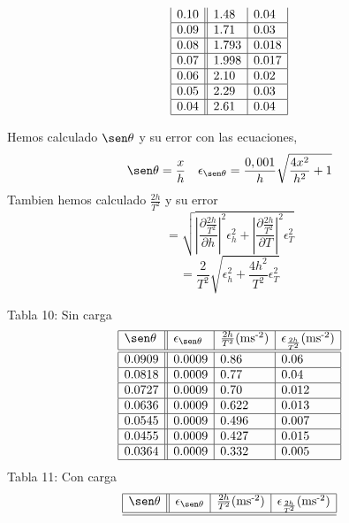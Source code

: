 \documentclass{article}
\begin{document}
\begin{multicols}{2}
\begin{center}
$$\begin{array}{cc}
\begin{array}{|l||l|l|}
        0.10 & 1.48  & 0.04   \\ \hline
        0.09 & 1.71  & 0.03   \\ \hline
        0.08 & 1.793 & 0.018  \\ \hline
        0.07 & 1.998 & 0.017  \\ \hline
        0.06 & 2.10  & 0.02   \\ \hline
        0.05 & 2.29  & 0.03   \\ \hline
        0.04 & 2.61  & 0.04   \\ \hline
        \end{array}
    \end{array}
    $$
\end{center}
Hemos calculado $\sen\theta$ y su error con las ecuaciones,
$$
\sen\theta = \frac{x}{h} \quad
\epsilon_{\sen\theta}
=
\frac{0,001}{h}
\sqrt{
    \frac{4x^2}{h^2} +1
}
$$
Tambien hemos calculado $\frac{2h}{T^2}$ y su error
$$
 = \sqrt{
    \left|
        \frac{\partial \frac{2h}{T^2}}{\partial h}
    \right|^2 \epsilon_h^2
    +
    \left|
        \frac{\partial \frac{2h}{T^2}}{\partial T}
    \right|^2 \epsilon_T^2
}
$$
$$
 = \frac{2}{T^2}\sqrt{
      \epsilon_h^2
    +
        \frac{4h^2}{T^2}
     \epsilon_T^2
}
$$
\begin{center}
    Tabla 10: Sin carga
    $$
    \begin{array}{|l||l|l|l|} \hline
        \sen\theta & \epsilon_{\sen\theta} & \frac{2h}{T^2} \text{(ms\textsuperscript{-2})} & \epsilon_{\frac{2h}{T^2}} \text{(ms\textsuperscript{-2})} \\ \hline \hline
        0.0909 & 0.0009 & 0.86  & 0.06   \\ \hline
        0.0818 & 0.0009 & 0.77  & 0.04   \\ \hline
        0.0727 & 0.0009 & 0.70  & 0.012  \\ \hline
        0.0636 & 0.0009 & 0.622 & 0.013  \\ \hline
        0.0545 & 0.0009 & 0.496 & 0.007  \\ \hline
        0.0455 & 0.0009 & 0.427 & 0.015  \\ \hline
        0.0364 & 0.0009 & 0.332 & 0.005  \\ \hline
        \end{array}
    $$
    Tabla 11: Con carga
    $$
    \begin{array}{|l||l|l|l|} \hline
        \sen\theta & \epsilon_{\sen\theta} & \frac{2h}{T^2} \text{(ms\textsuperscript{-2})} & \epsilon_{\frac{2h}{T^2}} \text{(ms\textsuperscript{-2})} \\ \hline \hline

\end{array}$$
\end{center}
\end{multicols}
\end{document}
